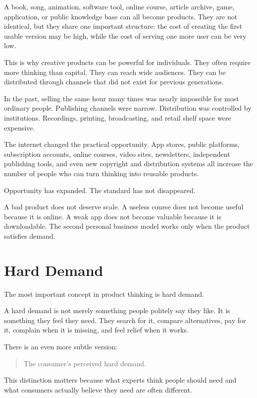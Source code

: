 A book, song, animation, software tool, online course, article archive, game, application, or public knowledge base can all become products. They are not identical, but they share one important structure: the cost of creating the first usable version may be high, while the cost of serving one more user can be very low.

This is why creative products can be powerful for individuals. They often require more thinking than capital. They can reach wide audiences. They can be distributed through channels that did not exist for previous generations.

In the past, selling the same hour many times was nearly impossible for most ordinary people. Publishing channels were narrow. Distribution was controlled by institutions. Recordings, printing, broadcasting, and retail shelf space were expensive.

The internet changed the practical opportunity. App stores, public platforms, subscription accounts, online courses, video sites, newsletters, independent publishing tools, and even new copyright and distribution systems all increase the number of people who can turn thinking into reusable products.

Opportunity has expanded. The standard has not disappeared.

A bad product does not deserve scale. A useless course does not become useful because it is online. A weak app does not become valuable because it is downloadable. The second personal business model works only when the product satisfies demand.

\section*{Hard Demand}

The most important concept in product thinking is hard demand.

A hard demand is not merely something people politely say they like. It is something they feel they need. They search for it, compare alternatives, pay for it, complain when it is missing, and feel relief when it works.

There is an even more subtle version:

\begin{quote}
The consumer's perceived hard demand.
\end{quote}

This distinction matters because what experts think people should need and what consumers actually believe they need are often different.

